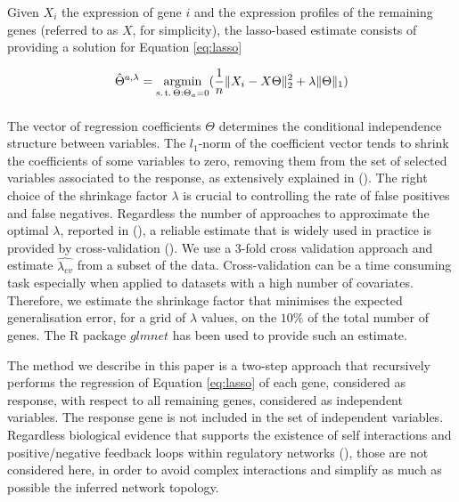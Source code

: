 Given $X_i$ the expression of gene $i$ and the expression profiles of the remaining genes  (referred to as $X$, for simplicity), the lasso-based estimate consists of providing a solution for Equation \ref{eq:lasso}
  
\begin{equation}
\label{eq:lasso}
    \hat{\Theta}^{a,\lambda} = 
    \argmin_{%
      \substack{%
        \text{s.\,t.}\, \Theta:\Theta_a = 0 \\
        \phantom{}\, 
      }
    }
    (\frac{1}{n} \| X_i - X\Theta \|^{2}_2 + \lambda \| \Theta \|_1)
  \end{equation}
  
The vector of regression coefficients $\Theta$ determines the conditional independence structure between variables. The $l_1$-norm of the coefficient vector tends to shrink the coefficients of some variables to zero, removing them from the set of selected variables associated to the response, as extensively explained in (\citealp{Tibshirani94regressionshrinkage}). 
The right choice of the shrinkage factor $\lambda$ is crucial to controlling the rate of false positives and false negatives. Regardless the number of approaches to approximate the optimal $\lambda$, reported in (\citealp{adalasso, efron2004, tuneparamsel}), a reliable estimate that is widely used in practice is provided by cross-validation (\citealp{glmnet}). 
We use a 3-fold cross validation approach and estimate $\hat{\lambda_{cv}}$ from a subset of the data. Cross-validation can be a time consuming task especially when applied to datasets with a high number of covariates. Therefore, we estimate the shrinkage factor that minimises the expected generalisation error, for a grid of $\lambda$ values, on the $10\%$ of the total number of genes. The R package $glmnet$ has been used to provide such an estimate.  

The method we describe in this paper is a two-step approach that recursively performs the regression of Equation \ref{eq:lasso} of each gene, considered as response, with respect to all remaining genes, considered as independent variables. The response gene is not included in the set of independent variables. Regardless biological evidence that supports the existence of self interactions and positive/negative feedback loops within regulatory networks (\citealp{netmotif, avrahamfeedback2011, generegmodel}), those are not considered here, in order to avoid complex interactions and simplify as much as possible the inferred network topology.

